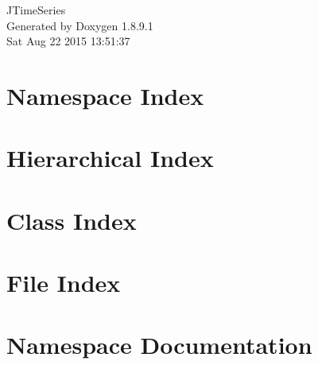\documentclass[twoside]{book}
\newcommand{\+}{\discretionary{\mbox{\scriptsize$\hookleftarrow$}}{}{}}
\newcommand{\clearemptydoublepage}{%
  \newpage{\pagestyle{empty}\cleardoublepage}%
}
\begin{document}
\hypersetup{pageanchor=false,
             bookmarks=true,
             bookmarksnumbered=true,
             pdfencoding=unicode
            }
\begin{titlepage}
\vspace*{7cm}
\begin{center}%
{\Large J\+Time\+Series }\\
\vspace*{1cm}
{\large Generated by Doxygen 1.8.9.1}\\
\vspace*{0.5cm}
{\small Sat Aug 22 2015 13:51:37}\\
\end{center}
\end{titlepage}
\clearemptydoublepage
\tableofcontents
\clearemptydoublepage
{}
\hypersetup{pageanchor=true}

\chapter{Namespace Index}

\chapter{Hierarchical Index}

\chapter{Class Index}

\chapter{File Index}

\chapter{Namespace Documentation}









\end{document}
